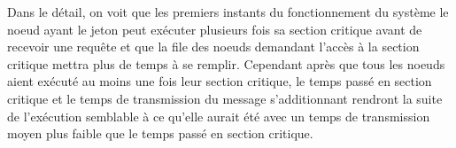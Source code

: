\documentclass[11pt,a4paper]{report}
\begin{document}
Dans le détail, on voit que les premiers instants du fonctionnement du système le noeud ayant le jeton peut exécuter plusieurs fois sa section critique avant de recevoir une requête et que la file des noeuds demandant l'accès à la section critique mettra plus de temps à se remplir. Cependant après que tous les noeuds aient exécuté au moins une fois leur section critique, le temps passé en section critique et le temps de transmission du message s'additionnant rendront la suite de l'exécution semblable à ce qu'elle aurait été avec un temps de transmission moyen plus faible que le temps passé en section critique.


\chapter{}


\chapter{}
\end{document}

